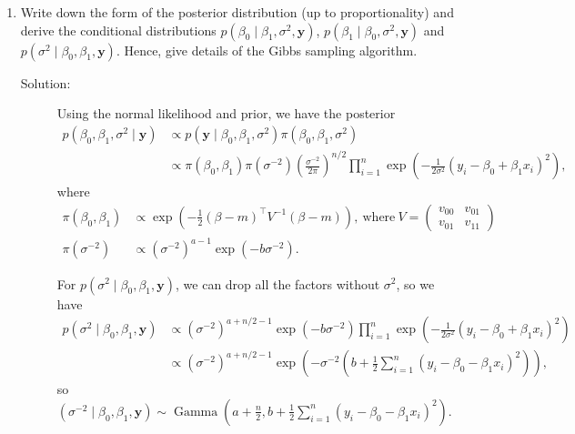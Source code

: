 \documentclass[letterpaper,11pt]{article}
\begin{document}
\begin{enumerate}
  \begin{enumerate}
  \item Write down the form of the posterior distribution (up to
    proportionality) and derive the conditional distributions
    $p\left(\beta_0 \mid \beta_1, \sigma^2, \mathbf{y}\right)$,
    $p\left(\beta_1 \mid \beta_0, \sigma^2, \mathbf{y}\right)$ and
    $p\left(\sigma^2 \mid \beta_0, \beta_1, \mathbf{y}\right)$. Hence, give details of the
    Gibbs sampling algorithm.

    \begin{description}
    \item[Solution:] Using the normal likelihood and prior, we have the posterior
      \begin{align*}
        p\left(\beta_0, \beta_1, \sigma^2\mid \mathbf{y}\right)
        &\propto p\left(\mathbf{y} \mid \beta_0, \beta_1, \sigma^2\right)\pi\left(
          \beta_0,\beta_1,\sigma^2
          \right) \\
        &\propto
          \pi\left(\beta_0,\beta_1\right)
          \pi\left(\sigma^{-2}\right)
          \left(\frac{\sigma^{-2}}{2\pi}\right)^{n/2}
          \prod_{i=1}^n
          \exp\left(
          -\frac{1}{2\sigma^2}\left(y_i - \beta_0 + \beta_1x_i\right)^2
          \right),
      \end{align*}
      where
      \begin{align*}
        \pi\left(\beta_0,\beta_1\right)
        &\propto \exp\left(-\frac{1}{2}
        \left(\beta - m\right)^\intercal V^{-1}\left(\beta - m\right)
        \right),~\text{where}~V=\begin{pmatrix}
        v_{00} & v_{01} \\ v_{01} & v_{11}
      \end{pmatrix} \\
        \pi\left(\sigma^{-2}\right)
        &\propto
        \left(\sigma^{-2}\right)^{a-1}\exp\left(-b\sigma^{-2}\right).
      \end{align*}

      For $p\left(\sigma^2 \mid \beta_0, \beta_1, \mathbf{y}\right)$, we can
      drop all the factors without $\sigma^2$, so we have
      \begin{align*}
        p\left(\sigma^2 \mid \beta_0, \beta_1, \mathbf{y}\right)
        &\propto
          \left(\sigma^{-2}\right)^{a + n/2 -1}\exp\left(-b\sigma^{-2}\right)
          \prod_{i=1}^n
          \exp\left(
          -\frac{1}{2\sigma^2}\left(y_i - \beta_0 + \beta_1x_i\right)^2
          \right) \\
        &\propto
          \left(\sigma^{-2}\right)^{a + n/2 -1}\exp\left(
          -\sigma^{-2}\left(b + \frac{1}{2}\sum_{i=1}^n\left(y_i - \beta_0 - \beta_1x_i\right)^2\right)
          \right),
      \end{align*}
      so $\boxed{\left(\sigma^{-2} \mid \beta_0, \beta_1, \mathbf{y} \right)\sim \operatorname{Gamma}\left(
          a + \frac{n}{2}, b + \frac{1}{2}\sum_{i=1}^n\left(y_i - \beta_0 - \beta_1x_i\right)^2\right).}$


\end{description}
\end{enumerate}
\end{enumerate}
\end{document}
